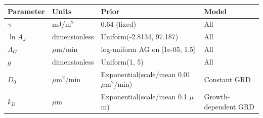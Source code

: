 \begin{tabular}{llll}
\hline
Parameter & Units & Prior & Model \\
\hline
$\gamma$ & mJ/m$^2$ & 0.64 (fixed) & All \\
$\ln A_J$ & dimensionless & Uniform(-2.8134, 97.187) & All \\
$A_G$ & $\mu$m/min & log-uniform AG on [1e-05, 1.5] & All \\
$g$ & dimensionless & Uniform(1, 5) & All \\
$D_0$ & $\mu$m$^2$/min & Exponential(scale/mean 0.01 $\mu$m$^2$/min) & Constant GRD \\
$k_D$ & $\mu$m & Exponential(scale/mean 0.1 $\mu$m) & Growth-dependent GRD \\
\hline
\end{tabular}
